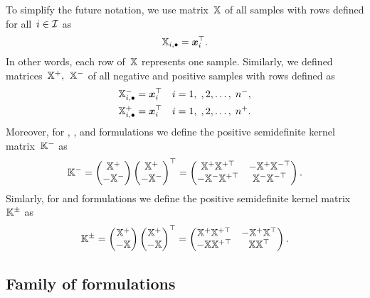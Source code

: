 \begin{notation}\label{not: kernel matrix}
  To simplify the future notation, we use matrix~$\mathbb{X}$ of all samples with rows defined for all~$i \in \mathcal{I}$ as 
  \begin{equation*}
    \mathbb{X}_{i, \bullet} = \bm{x}_i^{\top}.
  \end{equation*}
  In other words, each row of~$\mathbb{X}$ represents one sample. Similarly, we defined matrices~$\mathbb{X}^+,$~$\mathbb{X}^-$ of all negative and positive samples with rows defined as
  \begin{align*}
    \mathbb{X}^{-}_{i, \bullet} & = \bm{x}_i^{\top} \quad i = 1, \;, 2, \ldots, \; n^-, \\
    \mathbb{X}^{+}_{i, \bullet} & = \bm{x}_i^{\top} \quad i = 1, \;, 2, \ldots, \; n^+.
  \end{align*}
  Moreover, for \TopPush, \TopPushK, \tauFPL and \PatMatNP formulations we define the positive semidefinite kernel matrix~$\mathbb{K}^{-}$ as
  \begin{equation*}
    \mathbb{K}^{-} = \begin{pmatrix} \mathbb{X}^+ \\ - \mathbb{X}^- \end{pmatrix} \begin{pmatrix} \mathbb{X}^+ \\ - \mathbb{X}^- \end{pmatrix}^\top = \begin{pmatrix} \mathbb{X}^+ \mathbb{X}^{+\top} & -\mathbb{X}^+ \mathbb{X}^{-\top} \\ -\mathbb{X}^- \mathbb{X}^{+\top} & \mathbb{X}^- \mathbb{X}^{-\top}  \end{pmatrix}.
  \end{equation*}
  Simlarly, for \TopMeanK and \PatMat formulations we define the positive semidefinite kernel matrix~$\mathbb{K}^{\pm}$ as
  \begin{equation*}
    \mathbb{K}^{\pm} = \begin{pmatrix} \mathbb{X}^+ \\ - \mathbb{X} \end{pmatrix} \begin{pmatrix} \mathbb{X}^+ \\ - \mathbb{X} \end{pmatrix}^\top = \begin{pmatrix} \mathbb{X}^+ \mathbb{X}^{+\top} & -\mathbb{X}^+ \mathbb{X}^{\top} \\ -\mathbb{X} \mathbb{X}^{+\top} & \mathbb{X} \mathbb{X}^{\top}  \end{pmatrix}.
  \end{equation*}
\end{notation}

\subsection{Family of \TopPushK formulations}

